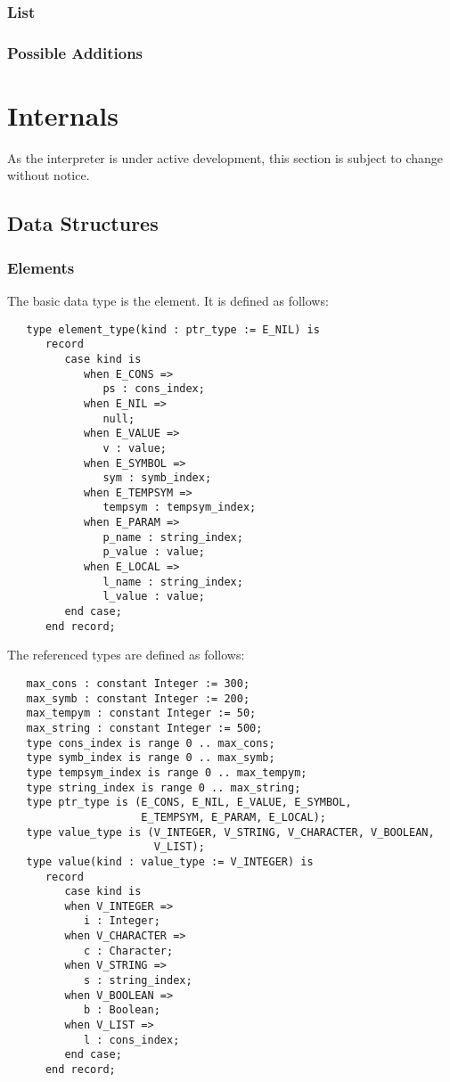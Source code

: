 \documentclass[10pt, openany]{book}
\begin{document}
\subsection{List}
\subsection{Possible Additions}

\chapter{Internals}
As the interpreter is under active development, this section is subject to change without notice.
\section{Data Structures}
\subsection{Elements}
The basic data type is the element.  It is defined as follows:
\lstset{language=Ada}
\begin{lstlisting}
   type element_type(kind : ptr_type := E_NIL) is
      record
         case kind is
            when E_CONS =>
               ps : cons_index;
            when E_NIL =>
               null;
            when E_VALUE =>
               v : value;
            when E_SYMBOL =>
               sym : symb_index;
            when E_TEMPSYM =>
               tempsym : tempsym_index;
            when E_PARAM =>
               p_name : string_index;
               p_value : value;
            when E_LOCAL =>
               l_name : string_index;
               l_value : value;
         end case;
      end record;
\end{lstlisting}
The referenced types are defined as follows:
\begin{lstlisting}
   max_cons : constant Integer := 300;
   max_symb : constant Integer := 200;
   max_tempym : constant Integer := 50;
   max_string : constant Integer := 500;
   type cons_index is range 0 .. max_cons;
   type symb_index is range 0 .. max_symb;
   type tempsym_index is range 0 .. max_tempym;
   type string_index is range 0 .. max_string;
   type ptr_type is (E_CONS, E_NIL, E_VALUE, E_SYMBOL,
                     E_TEMPSYM, E_PARAM, E_LOCAL);
   type value_type is (V_INTEGER, V_STRING, V_CHARACTER, V_BOOLEAN,
                       V_LIST);
   type value(kind : value_type := V_INTEGER) is
      record
         case kind is
         when V_INTEGER =>
            i : Integer;
         when V_CHARACTER =>
            c : Character;
         when V_STRING =>
            s : string_index;
         when V_BOOLEAN =>
            b : Boolean;
         when V_LIST =>
            l : cons_index;
         end case;
      end record;
\end{lstlisting}
\end{document}
